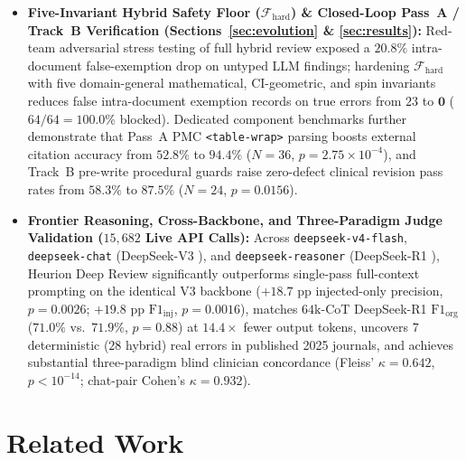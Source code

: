 \documentclass[11pt,a4paper]{article}
\begin{document}
\begin{itemize}[leftmargin=1.5em,itemsep=2pt]
  \item \textbf{Five-Invariant Hybrid Safety Floor ($\mathcal{F}_{\text{hard}}$) \& Closed-Loop Pass~A / Track~B Verification (Sections~\ref{sec:evolution} \& \ref{sec:results}):} Red-team adversarial stress testing of full hybrid review exposed a $20.8\%$ intra-document false-exemption drop on untyped LLM findings; hardening $\mathcal{F}_{\text{hard}}$ with five domain-general mathematical, CI-geometric, and spin invariants reduces false intra-document exemption records on true errors from $23$ to $\mathbf{0}$ ($64/64 = \mathbf{100.0\%}$ blocked). Dedicated component benchmarks further demonstrate that Pass~A PMC \texttt{<table-wrap>} parsing boosts external citation accuracy from $52.8\%$ to $\mathbf{94.4\%}$ ($N=36$, $p=2.75\times 10^{-4}$), and Track~B pre-write procedural guards raise zero-defect clinical revision pass rates from $58.3\%$ to $\mathbf{87.5\%}$ ($N=24$, $p=0.0156$).
  \item \textbf{Frontier Reasoning, Cross-Backbone, and Three-Paradigm Judge Validation ($15{,}682$ Live API Calls):} Across \texttt{deepseek-v4-flash}, \texttt{deepseek-chat} (DeepSeek-V3 \cite{deepseekv3_2024}), and \texttt{deepseek-reasoner} (DeepSeek-R1 \cite{deepseekr1_2025}), Heurion Deep Review significantly outperforms single-pass full-context prompting on the identical V3 backbone ($+18.7\text{ pp}$ injected-only precision, $p=0.0026$; $+19.8\text{ pp}$ $\text{F1}_{\text{inj}}$, $p=0.0016$), matches $64\text{k}$-CoT DeepSeek-R1 $\text{F1}_{\text{org}}$ ($71.0\%$ vs.\ $71.9\%$, $p=0.88$) at $\mathbf{14.4\times}$ fewer output tokens, uncovers $7$ deterministic ($28$ hybrid) real errors in published 2025 journals, and achieves substantial three-paradigm blind clinician concordance (Fleiss' $\kappa = \mathbf{0.642}$, $p < 10^{-14}$; chat-pair Cohen's $\kappa = \mathbf{0.932}$).
\end{itemize}

\section{Related Work}
\label{sec:related}
\end{document}
